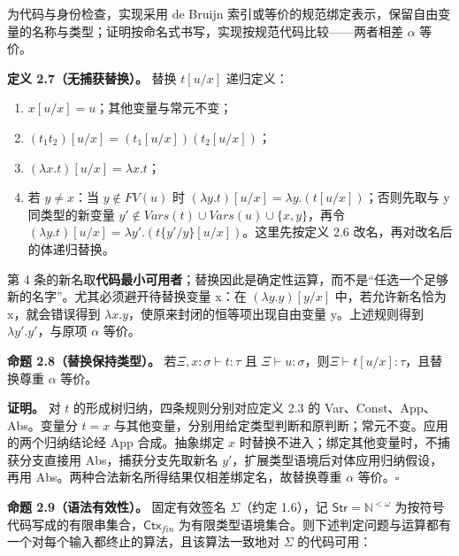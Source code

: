 \documentclass[UTF8,a4paper,zihao=-4,fontset=windows,openany]{ctexbook}
\def\mathrm#1{#1}%
\begin{document}
为代码与身份检查，实现采用 de Bruijn 索引或等价的规范绑定表示，保留自由变量的名称与类型；证明按命名式书写，实现按规范代码比较——两者相差 \(\alpha\) 等价。

\textbf{定义 2.7（无捕获替换）。} 替换 \(t[u/x]\) 递归定义：

\begin{enumerate}
\item \(x[u/x]=u\)；其他变量与常元不变；
\item \((t_1t_2)[u/x]=(t_1[u/x])(t_2[u/x])\)；
\item \((\lambda x.t)[u/x]=\lambda x.t\)；
\item 若 \(y\ne x\)：当 \(y\notin FV(u)\) 时 \((\lambda y.t)[u/x]=\lambda y.(t[u/x])\)；否则先取与 y 同类型的新变量 \(y'\notin Vars(t)\cup Vars(u)\cup\{x,y\}\)，再令 \((\lambda y.t)[u/x]=\lambda y'.(t\{y'/y\}[u/x])\)。这里先按定义 2.6 改名，再对改名后的体递归替换。
\end{enumerate}
第 4 条的新名取\textbf{代码最小可用者}；替换因此是确定性运算，而不是“任选一个足够新的名字”。尤其必须避开待替换变量 x：在 \((\lambda y.y)[y/x]\) 中，若允许新名恰为 x，就会错误得到 \(\lambda x.y\)，使原来封闭的恒等项出现自由变量 y。上述规则得到 \(\lambda y'.y'\)，与原项 \(\alpha\) 等价。

\textbf{命题 2.8（替换保持类型）。} 若\(\Xi,x:\sigma\vdash t:\tau\) 且 \(\Xi\vdash u:\sigma\)，则\(\Xi\vdash t[u/x]:\tau\)，且替换尊重 \(\alpha\) 等价。

\textbf{证明。} 对 \(t\) 的形成树归纳，四条规则分别对应定义 2.3 的 Var、Const、App、Abs。变量分 \(t=x\) 与其他变量，分别用给定类型判断和原判断；常元不变。应用的两个归纳结论经 App 合成。抽象绑定 \(x\) 时替换不进入；绑定其他变量时，不捕获分支直接用 Abs，捕获分支先取新名 \(y'\)，扩展类型语境后对体应用归纳假设，再用 Abs。两种合法新名所得结果仅相差绑定名，故替换尊重 \(\alpha\) 等价。\(\square\)

\textbf{命题 2.9（语法有效性）。} 固定有效签名 \(\Sigma\)（约定 1.6），记 \(\mathsf{Str}=\mathbb N^{<\omega}\) 为按符号代码写成的有限串集合，\(\mathsf{Ctx}_{\mathrm{fin}}\) 为有限类型语境集合。则下述判定问题与运算都有一个对每个输入都终止的算法，且该算法一致地对 \(\Sigma\) 的代码可用：
\end{document}
